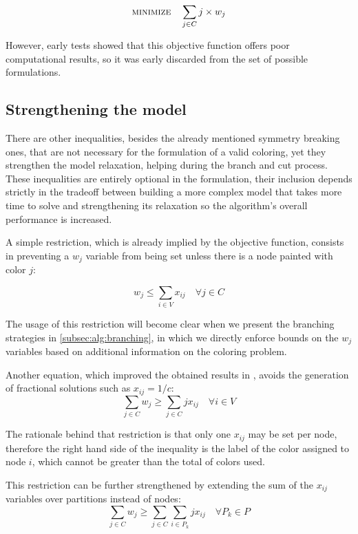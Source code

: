 \begin{equation}
\label{eqn:objlinear}
\text{\textsc{minimize}} \quad \sum_{j \in C} j \times w_j 
\end{equation}

However, early tests showed that this objective function offers poor computational results, so it was early discarded from the set of possible formulations.

\subsection{Strengthening the model}

There are other inequalities, besides the already mentioned symmetry breaking ones, that are not necessary for the formulation of a valid coloring, yet they strengthen the model relaxation, helping during the branch and cut process. These inequalities are entirely optional in the formulation, their inclusion depends strictly in the tradeoff between building a more complex model that takes more time to solve and strengthening its relaxation so the algorithm's overall performance is increased.

A simple restriction, which is already implied by the objective function, consists in preventing a $w_j$ variable from being set unless there is a node painted with color $j$:

\begin{equation}
\label{eqn:wjleqsumcolor}
w_j \leq \sum_{i \in V} x_{ij} \quad \forall j \in C
\end{equation}

The usage of this restriction will become clear when we present the branching strategies in \ref{subsec:alg:branching}, in which we directly enforce bounds on the $w_j$ variables based on additional information on the coloring problem.

Another equation, which improved the obtained results in \cite{mendez2006branch}, avoids the generation of fractional solutions such as $x_{ij} = 1/c$:
\begin{equation}
\label{eqn:wjgeqsumnode}
\sum_{j \in C} w_j \geq \sum_{j \in C} j x_{ij} \quad \forall i \in V
\end{equation}

The rationale behind that restriction is that only one $x_{ij}$ may be set per node, therefore the right hand side of the inequality is the label of the color assigned to node $i$, which cannot be greater than the total of colors used.

This restriction can be further strengthened by extending the sum of the $x_{ij}$ variables over partitions instead of nodes:
\begin{equation}
\label{eqn:wjgeqsumpart}
\sum_{j \in C} w_j \geq \sum_{j \in C} \sum_{i \in P_k} j x_{ij} \quad \forall P_k \in P
\end{equation}
